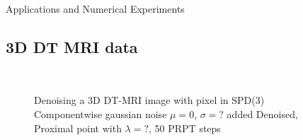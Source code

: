 \begin{chapter}{Applications and Numerical Experiments}
\subsection{3D DT MRI data} %
\label{sub:3DDTMRIdata}
\begin{figure}[h!]
    \centering
    \\
    \caption[Denoising 3D DTI-MRI data]{Denoising a 3D DT-MRI image with pixel in SPD(3)
	 Componentwise gaussian noise $\mu=0$, $\sigma=?$ added
	 Denoised, Proximal point with $\lambda=?$, 50 PRPT steps
	\label{fig:application_dti2}
    }
\end{figure}


\end{chapter}

